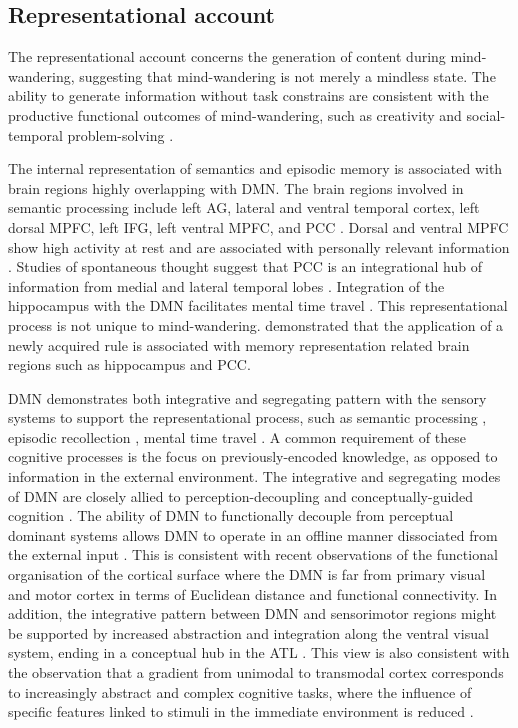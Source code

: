 \subsection{Representational account}

The representational account concerns the generation of content during mind-wandering, suggesting that mind-wandering is not merely a mindless state. The ability to generate information without task constrains are consistent with the productive functional outcomes of mind-wandering, such as creativity \cite{Baird2012,Smeekens2016} and social-temporal problem-solving \cite{RubyPlos2013,PoerioFrontiers2016,Medea2016}. 

The internal representation of semantics and episodic memory is associated with brain regions highly overlapping with DMN. The brain regions involved in semantic processing include left AG, lateral and ventral temporal cortex, left dorsal MPFC, left IFG, left ventral MPFC, and PCC \cite{Binder2009,Lambon-Ralph2017}. Dorsal and ventral MPFC show high activity at rest and are associated with personally relevant information \cite{Gusnard2001}. Studies of spontaneous thought suggest that PCC is an integrational hub of information from medial and lateral temporal lobes \cite{Smallwood2016}. Integration of the hippocampus with the DMN facilitates mental time travel \cite{Karapanagiotidis2017}. This representational process is not unique to mind-wandering.  demonstrated that the application of a newly acquired rule is associated with memory representation related brain regions such as hippocampus and PCC. 

DMN demonstrates both integrative and segregating pattern with the sensory systems to support the representational process, such as semantic processing \cite{Binder2009,Krieger-Redwood2016}, episodic recollection \cite{Rugg2013}, mental time travel \cite{Schacter2007}. A common requirement of these cognitive processes is the focus on previously-encoded knowledge, as opposed to information in the external environment.
The integrative and segregating modes of DMN are closely allied to perception-decoupling and conceptually-guided cognition \cite{Murphy2018}. 
The ability of DMN to functionally decouple from perceptual dominant systems allows DMN to operate in an offline manner dissociated from the external input \cite{Smallwood2013}. This is consistent with recent observations of the functional organisation of the cortical surface \cite{Margulies2016} where the DMN is far from primary visual and motor cortex in terms of Euclidean distance and functional connectivity. 
In addition, the integrative pattern between DMN and sensorimotor regions might be supported by increased abstraction and integration along the ventral visual system, ending in a conceptual hub in the ATL \cite{Lambon-Ralph2017}. 
This view is also consistent with the observation that a gradient from unimodal to transmodal cortex \cite{Margulies2016} corresponds to increasingly abstract and complex cognitive tasks, where the influence of specific features linked to stimuli in the immediate environment is reduced \cite{Mesulam1998,Buckner2013,Margulies2016}.

